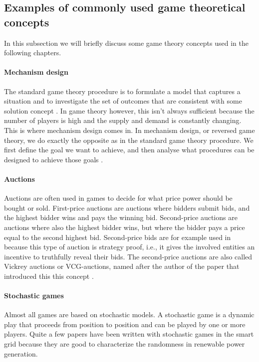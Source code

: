 \subsection{Examples of commonly used game theoretical concepts}
In this subsection we will briefly discuss some game theory concepts used in the following chapters. 

\paragraph{Mechanism design}
The standard game theory procedure is to formulate a model that
captures a situation and to investigate the set of outcomes that are
consistent with some solution concept \cite{CourseInGameTheory}. In game theory however, this isn't always sufficient because the number of players is high and the supply and demand is constantly changing. This is where mechanism design comes in. In mechanism design, or reversed game theory, we do exactly the opposite as in the standard game theory procedure. We first define the goal we want to achieve, and then analyse what procedures can be designed to achieve those goals \cite{SalfatiRabinovici2014}. 
 

\paragraph{Auctions}
Auctions are often used in games to decide for what price power should be bought or sold. First-price auctions are auctions where bidders submit bids, and the highest bidder wins and pays the winning bid. Second-price auctions are auctions where also the highest bidder wins, but where the bidder pays a price equal to the second highest bid. Second-price bids are for example used in \cite{SaadHanPoorEtAl2011} because this type of auction is strategy proof, i.e., it gives the involved entities an incentive to truthfully reveal their bids. The second-price auctions are also called Vickrey auctions or VCG-auctions, named after the author of the paper that introduced this this concept \cite{Vickrey1961}.

\paragraph{Stochastic games}
Almost all games are based on stochastic models. A stochastic game is a dynamic play that proceeds from position to position \cite{Shapley1953} and can be played by one or more players. Quite a few papers have been written with stochastic games in the smart grid \cite{LiangZhuang2014} because they are good to characterize the randomness in renewable power generation.  
